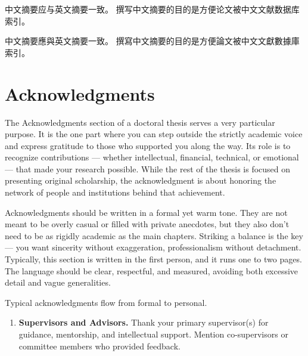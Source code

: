 \documentclass[PCOM,Thesis,Review]{mpThesis}
\newcommand{\Hd}[1]{{\color{SteelBlue}\bf#1.}}
\begin{document}
\begin{FrontMatter}[FigLs=true,TabLs=true,AlgoLs=false,AbbreLs=true]
\begin{ChsAbstract}
\begin{Remark}
中文摘要应与英文摘要一致。
撰写中文摘要的目的是方便论文被中文文献数据库索引。
\end{Remark}
\end{ChsAbstract}

\ChsKeywords{\InsertThesisChsKeywords}

\begin{ChtAbstract}
\begin{Remark}
中文摘要應與英文摘要一致。
撰寫中文摘要的目的是方便論文被中文文獻數據庫索引。
\end{Remark}
\end{ChtAbstract}

\ChtKeywords{\InsertThesisChtKeywords}

\chapter{Acknowledgments}

\begin{Remark}
The Acknowledgments section of a doctoral thesis serves a very particular purpose.
It is the one part where you can step outside the strictly academic voice and express gratitude to those who supported you along the way.
Its role is to recognize contributions ---
whether intellectual, financial, technical, or emotional ---
that made your research possible.
While the rest of the thesis is focused on presenting original scholarship,
the acknowledgment is about honoring the network of people and institutions behind that achievement.

Acknowledgments should be written in a formal yet warm tone.
They are not meant to be overly casual or filled with private anecdotes, but they also don't need to be as rigidly academic as the main chapters.
Striking a balance is the key ---
you want sincerity without exaggeration, professionalism without detachment.
Typically, this section is written in the first person, and it runs one to two pages.
The language should be clear, respectful, and measured, avoiding both excessive detail and vague generalities.

Typical acknowledgments flow from formal to personal.
\begin{enumerate}
\item \Hd{Supervisors and Advisors}
Thank your primary supervisor(s) for guidance, mentorship, and intellectual support. Mention co-supervisors or committee members who provided feedback.


\end{enumerate}
\end{Remark}
\end{FrontMatter}
\end{document}
